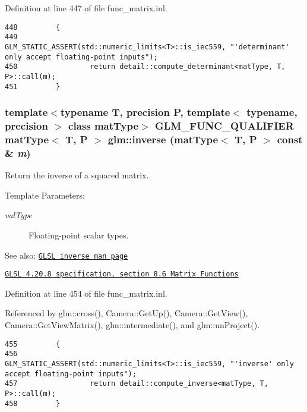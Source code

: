 Definition at line 447 of file func\_\-matrix.inl.

\begin{Code}\begin{verbatim}448         {
449                 GLM_STATIC_ASSERT(std::numeric_limits<T>::is_iec559, "'determinant' only accept floating-point inputs");
450                 return detail::compute_determinant<matType, T, P>::call(m);
451         }
\end{verbatim}
\end{Code}


\hypertarget{group__core__func__matrix_g4b56decdc6560a13b616c6312bdcc17e}{
\subsubsection[inverse]{\setlength{\rightskip}{0pt plus 5cm}template$<$typename T, precision P, template$<$ typename, precision $>$ class matType$>$ GLM\_\-FUNC\_\-QUALIFIER matType$<$ T, P $>$ glm::inverse (matType$<$ T, P $>$ const \& {\em m})}}
\label{group__core__func__matrix_g4b56decdc6560a13b616c6312bdcc17e}


Return the inverse of a squared matrix.

\begin{Desc}
\item[Template Parameters:]
\begin{description}
\item[{\em valType}]Floating-point scalar types.\end{description}
\end{Desc}
\begin{Desc}
\item[See also:]\href{http://www.opengl.org/sdk/docs/manglsl/xhtml/inverse.xml}{\tt GLSL inverse man page} 

\href{http://www.opengl.org/registry/doc/GLSLangSpec.4.20.8.pdf}{\tt GLSL 4.20.8 specification, section 8.6 Matrix Functions} \end{Desc}


Definition at line 454 of file func\_\-matrix.inl.

Referenced by glm::cross(), Camera::GetUp(), Camera::GetView(), Camera::GetViewMatrix(), glm::intermediate(), and glm::unProject().

\begin{Code}\begin{verbatim}455         {
456                 GLM_STATIC_ASSERT(std::numeric_limits<T>::is_iec559, "'inverse' only accept floating-point inputs");
457                 return detail::compute_inverse<matType, T, P>::call(m);
458         }
\end{verbatim}
\end{Code}




